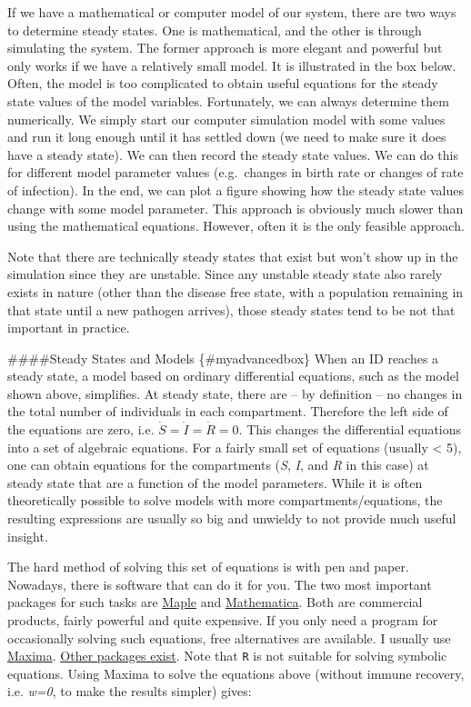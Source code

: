 \documentclass[]{book}
\theoremstyle{definition}
\theoremstyle{definition}
\theoremstyle{definition}
\theoremstyle{remark}
\begin{document}
If we have a mathematical or computer model of our system, there are two
ways to determine steady states. One is mathematical, and the other is
through simulating the system. The former approach is more elegant and
powerful but only works if we have a relatively small model. It is
illustrated in the box below. Often, the model is too complicated to
obtain useful equations for the steady state values of the model
variables. Fortunately, we can always determine them numerically. We
simply start our computer simulation model with some values and run it
long enough until it has settled down (we need to make sure it does have
a steady state). We can then record the steady state values. We can do
this for different model parameter values (e.g.~changes in birth rate or
changes of rate of infection). In the end, we can plot a figure showing
how the steady state values change with some model parameter. This
approach is obviously much slower than using the mathematical equations.
However, often it is the only feasible approach.

Note that there are technically steady states that exist but won't show
up in the simulation since they are unstable. Since any unstable steady
state also rarely exists in nature (other than the disease free state,
with a population remaining in that state until a new pathogen arrives),
those steady states tend to be not that important in practice.

\#\#\#\#Steady States and Models \{\#myadvancedbox\} When an ID reaches
a steady state, a model based on ordinary differential equations, such
as the model shown above, simplifies. At steady state, there are -- by
definition -- no changes in the total number of individuals in each
compartment. Therefore the left side of the equations are zero, i.e.
\(\dot S = \dot I = \dot R =0\). This changes the differential equations
into a set of algebraic equations. For a fairly small set of equations
(usually \textless{} 5), one can obtain equations for the compartments
(\emph{S}, \emph{I}, and \emph{R} in this case) at steady state that are
a function of the model parameters. While it is often theoretically
possible to solve models with more compartments/equations, the resulting
expressions are usually so big and unwieldy to not provide much useful
insight.

The hard method of solving this set of equations is with pen and paper.
Nowadays, there is software that can do it for you. The two most
important packages for such tasks are
\href{http://www.maplesoft.com/}{Maple} and
\href{https://www.wolfram.com/mathematica/}{Mathematica}. Both are
commercial products, fairly powerful and quite expensive. If you only
need a program for occasionally solving such equations, free
alternatives are available. I usually use
\href{http://maxima.sourceforge.net/}{Maxima}.
\href{http://en.wikipedia.org/wiki/Comparison_of_computer_algebra_systems}{Other
packages exist}. Note that \texttt{R} is not suitable for solving
symbolic equations. Using Maxima to solve the equations above (without
immune recovery, i.e. \emph{w=0}, to make the results simpler) gives:
\end{document}
